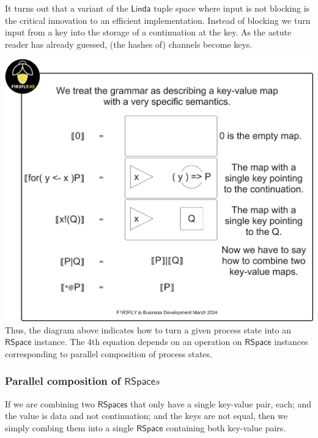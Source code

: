 It turns out that a variant of the $\mathsf{Linda}$ tuple space where
input is not blocking is the critical innovation to an efficient
implementation. Instead of blocking we turn input from a key into the
storage of a continuation at the key. As the astute reader has already
guessed, (the hashes of) channels become keys.

\includegraphics[scale=0.25]{RHO20RSpaceSlide1.pdf} \\

Thus, the diagram above indicates how to turn a given process state
into an $\mathsf{RSpace}$ instance. The 4th equation depends on an
operation on $\mathsf{RSpace}$ instances corresponding to parallel
composition of process states. 

\subsubsection{Parallel composition of $\mathsf{RSpace}s$}
If we are combining two $\mathsf{RSpaces}$ that only have a single
key-value pair, each; and the value is data and not continuation; and
the keys are not equal, then we simply combing them into a single
$\mathsf{RSpace}$ containing both key-value pairs. \\

